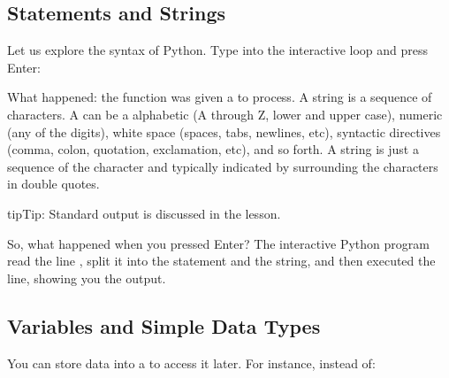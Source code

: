 \subsection{Statements and Strings}
\label{\detokenize{lesson/prg/python_intro:statements-and-strings}}
Let us explore the syntax of Python.  Type into the interactive loop
and press Enter:

\begin{sphinxVerbatim}[commandchars=\\\{\}]
\end{sphinxVerbatim}

What happened: the  function was given a  to
process. A string is a sequence of characters.  A  can be
a alphabetic (A through Z, lower and upper case), numeric (any of the
digits), white space (spaces, tabs, newlines, etc), syntactic
directives (comma, colon, quotation, exclamation, etc), and so forth.
A string is just a sequence of the character and typically indicated
by surrounding the characters in double quotes.

\begin{sphinxadmonition}{tip}{Tip:}
Standard output is discussed in the
 lesson.
\end{sphinxadmonition}

So, what happened when you pressed Enter?  The interactive Python
program read the line , split it into
the  statement and the  string, and
then executed the line, showing you the output.


\subsection{Variables and Simple Data Types}
\label{\detokenize{lesson/prg/python_intro:variables-and-simple-data-types}}
You can store data into a  to access it later.
For instance, instead of:

\begin{sphinxVerbatim}[commandchars=\\\{\}]
\end{sphinxVerbatim}


